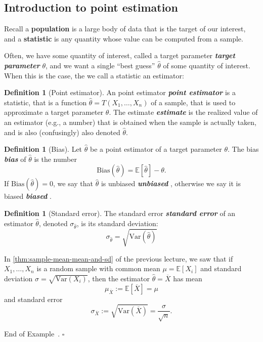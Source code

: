 \documentclass[10pt]{article}
\theoremstyle{definition}
\newtheorem{definition}[theorem]{Definition}
\newtheorem{example}[theorem]{Example}
\renewenvironment{example}
{\begin{oldexample}}
  {\par\smallskip\hfill   End of Example~\theexample. $\square$    \par\end{oldexample}}
\newcommand{\1}[1]{\textbf{1}_{\left[#1\right]}} %
\def\E{\mathbb{E}} %
\def\Var{\mathrm{Var}} %
\DeclareRobustCommand{\demph}[1]{%
  \ifmmode
  {\color{Blue}#1}%
  \else
  {\color{Blue}\bfseries\slshape #1}%
  \fi
}
\begin{document}
\subsection{Introduction to point estimation}



Recall a \textbf{population} is a large body of data that is the target of our
interest, and a \textbf{statistic} is any quantity whose value can be computed from a
sample.

Often, we have some quantity of interest, called a \demph{target parameter} $\theta$,
and we want a single ``best guess'' $\hat{\theta}$ of some quantity of interest. When this is
the case, the we call a statistic an estimator:

\begin{definition}[Point estimator]
  \label{def:estimator}
  An \demph{point estimator} is a statistic, that is a function
  $\widehat{\theta}=T(X_{1},\ldots,X_{n})$ of a sample, that is used to approximate a target
  parameter $\theta$. 
  The \demph{estimate} is the realized value of an
  estimator (e.g., a number) that is obtained when the sample is actually
  taken, and is also (confusingly) also denoted $\hat{\theta}$. 
\end{definition}

\begin{definition}[Bias]
  \label{def:bias-and-standard-error}
  Let $\widehat{\theta}$ be a point estimator of a target parameter $\theta$.
  The \demph{bias} of $\widehat{\theta}$ is the number
  \begin{equation*}
    \text{Bias}(\widehat{\theta})=\E[\widehat{\theta}]-\theta.
  \end{equation*}
  If $\text{Bias}(\widehat{\theta})=0$, we say that $\widehat{\theta}$ is
  \demph{unbiased}, otherwise we say it is \demph{biased}.
\end{definition}

\begin{definition}[Standard error]
  The \demph{standard error} of an estimator $\widehat{\theta}$, denoted
  $\sigma_{\widehat{\theta}}$, is its standard deviation:
  \begin{equation*}
    \sigma_{\widehat{\theta}} = \sqrt{\Var(\widehat{\theta})}
  \end{equation*}
\end{definition}

\begin{example}
  \label{ex:mean-std-error-for-sample-mean}
  In \cref{thm:sample-mean-mean-and-sd} of the previous lecture, we saw that if
  $X_{1},\ldots,X_{n}$ is a random sample with common mean $\mu=\E[X_{i}]$ and
  standard deviation $\sigma=\sqrt{\Var(X_{i})}$, then the estimator
  $\widehat{\theta}=\overline{X}$ has mean
  \begin{equation*}
    \mu_{\overline{X}} := \E[\overline{X}] = \mu
  \end{equation*}
  and standard error
  \begin{equation}\label{eq:4}
    \sigma_{\overline{X}} := \sqrt{\Var(\overline{X})} = \frac{\sigma}{\sqrt{n}}.
  \end{equation}
\end{example}
\end{document}
